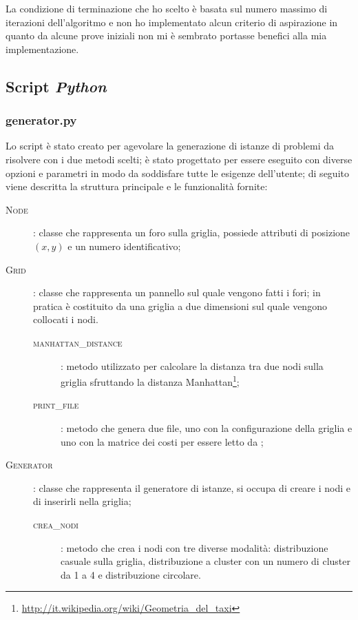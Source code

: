 La condizione di terminazione che ho scelto è basata sul numero massimo di iterazioni dell'algoritmo e non ho implementato alcun criterio di aspirazione in quanto da alcune prove iniziali non mi è sembrato portasse benefici alla mia implementazione.

\subsection{Script \emph{Python}}
\subsubsection{generator.py}
Lo script  è stato creato per agevolare la generazione di istanze di problemi da risolvere con i due metodi scelti; è stato progettato per essere eseguito con diverse opzioni e parametri in modo da soddisfare tutte le esigenze dell'utente; di seguito viene descritta la struttura principale e le funzionalità fornite:

\begin{description}
	\item[\textsc{Node}]: classe che rappresenta un foro sulla griglia, possiede attributi di posizione $(x, y)$ e un numero identificativo;
	\item[\textsc{Grid}]: classe che rappresenta un pannello sul quale vengono fatti i fori; in pratica è costituito da una griglia a due dimensioni sul quale vengono collocati i nodi.
	\begin{description}
		\item[\textsc{manhattan\_distance}]: metodo utilizzato per calcolare la distanza tra due nodi sulla griglia sfruttando la distanza Manhattan\footnote{\url{http://it.wikipedia.org/wiki/Geometria_del_taxi}};
		\item[\textsc{print\_file}]: metodo che genera due file, uno con la configurazione della griglia e uno con la matrice dei costi per essere letto da ;
	\end{description}
	\item[\textsc{Generator}]: classe che rappresenta il generatore di istanze, si occupa di creare i nodi e di inserirli nella griglia;
	\begin{description}
		\item[\textsc{crea\_nodi}]: metodo che crea i nodi con tre diverse modalità: distribuzione casuale sulla griglia, distribuzione a cluster con un numero di cluster da 1 a 4 e distribuzione circolare.
	\end{description}
\end{description}


